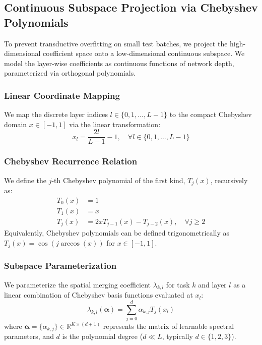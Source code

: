 \subsection{Continuous Subspace Projection via Chebyshev Polynomials}
To prevent transductive overfitting on small test batches, we project the high-dimensional coefficient space onto a low-dimensional continuous subspace. We model the layer-wise coefficients as continuous functions of network depth, parameterized via orthogonal polynomials. 

\subsubsection{Linear Coordinate Mapping}
We map the discrete layer indices $l \in \{0, 1, \dots, L-1\}$ to the compact Chebyshev domain $x \in [-1, 1]$ via the linear transformation:
\begin{equation}
x_l = \frac{2l}{L-1} - 1, \quad \forall l \in \{0, 1, \dots, L-1\}
\end{equation}

\subsubsection{Chebyshev Recurrence Relation}
We define the $j$-th Chebyshev polynomial of the first kind, $T_j(x)$, recursively as:
\begin{align}
T_0(x) &= 1 \\
T_1(x) &= x \\
T_j(x) &= 2x T_{j-1}(x) - T_{j-2}(x), \quad \forall j \ge 2
\end{align}
Equivalently, Chebyshev polynomials can be defined trigonometrically as $T_j(x) = \cos(j \arccos(x))$ for $x \in [-1, 1]$.

\subsubsection{Subspace Parameterization}
We parameterize the spatial merging coefficient $\lambda_{k, l}$ for task $k$ and layer $l$ as a linear combination of Chebyshev basis functions evaluated at $x_l$:
\begin{equation}
\label{eq:cheby_param}
\lambda_{k, l}(\boldsymbol{\alpha}) = \sum_{j=0}^d \alpha_{k, j} T_j(x_l)
\end{equation}
where $\boldsymbol{\alpha} = \{ \alpha_{k, j} \} \in \mathbb{R}^{K \times (d+1)}$ represents the matrix of learnable spectral parameters, and $d$ is the polynomial degree ($d \ll L$, typically $d \in \{1, 2, 3\}$).

